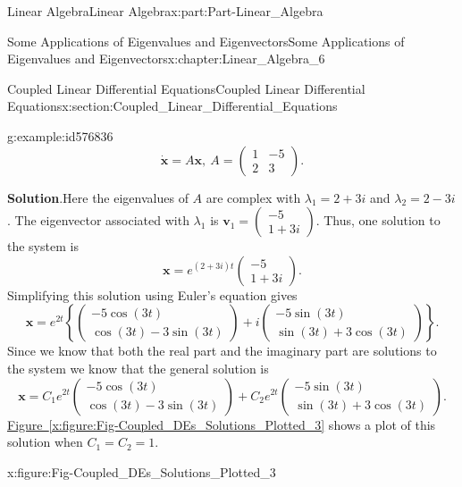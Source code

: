 \documentclass[oneside,10pt,]{book}
\newcommand{\blocktitlefont}{\relax}
\newcommand{\xreffont}{\relax}
\numberwithin{equation}{section}
\newcommand{\bm}[1]{\boldsymbol{#1}}
\newcommand{\amp}{&}
\begin{document}
\begin{partptx}{Linear Algebra}{}{Linear Algebra}{}{}{x:part:Part-Linear_Algebra}
\begin{chapterptx}{Some Applications of Eigenvalues and Eigenvectors}{}{Some Applications of Eigenvalues and Eigenvectors}{}{}{x:chapter:Linear_Algebra_6}
\begin{sectionptx}{Coupled Linear Differential Equations}{}{Coupled Linear Differential Equations}{}{}{x:section:Coupled_Linear_Differential_Equations}
\begin{example}{}{g:example:id576836}
\begin{equation*}
\dot{\bm{x}} = A \bm{x}, \: A = 
\begin{pmatrix} 1 \amp -5 \\ 2 \amp 3 \end{pmatrix}\text{.}
\end{equation*}
%
\par\smallskip%
\noindent\textbf{\blocktitlefont Solution}.\hypertarget{g:solution:id576805}{}\quad{}Here the eigenvalues of \(A\) are complex with \(\lambda_1 = 2+3i\) and \(\lambda_2 = 2-3i\). The eigenvector associated with \(\lambda_1\) is \(\bm{v}_1 = \begin{pmatrix} -5 \\ 1+3i \end{pmatrix}\). Thus, one solution to the system is%
\begin{equation*}
\bm{x} = e^{(2+3i)t} \begin{pmatrix} -5 \\ 1+3i \end{pmatrix}\text{.}
\end{equation*}
Simplifying this solution using Euler’s equation gives%
\begin{equation*}
\bm{x} = e^{2t} \left \{ \begin{pmatrix} -5\cos(3t) \\ \cos(3t) - 3 \sin(3t) \end{pmatrix} + i \begin{pmatrix} -5\sin(3t) \\ \sin(3t) + 3\cos(3t) \end{pmatrix} \right \}\text{.}
\end{equation*}
Since we know that both the real part and the imaginary part are solutions to the system we know that the general solution is%
\begin{equation*}
\bm{x} = C_1 e^{2t} \begin{pmatrix} -5\cos(3t) \\ \cos(3t) - 3 \sin(3t) \end{pmatrix} + C_2 e^{2t} \begin{pmatrix} -5\sin(3t) \\ \sin(3t) + 3\cos(3t) \end{pmatrix}\text{.}
\end{equation*}
\hyperref[x:figure:Fig-Coupled_DEs_Solutions_Plotted_3]{Figure~{\xreffont\ref{x:figure:Fig-Coupled_DEs_Solutions_Plotted_3}}} shows a plot of this solution when \(C_1 = C_2 = 1\).%
\begin{figureptx}{}{x:figure:Fig-Coupled_DEs_Solutions_Plotted_3}{}%

\end{figureptx}
\end{example}
\end{sectionptx}
\end{chapterptx}
\end{partptx}
\end{document}
